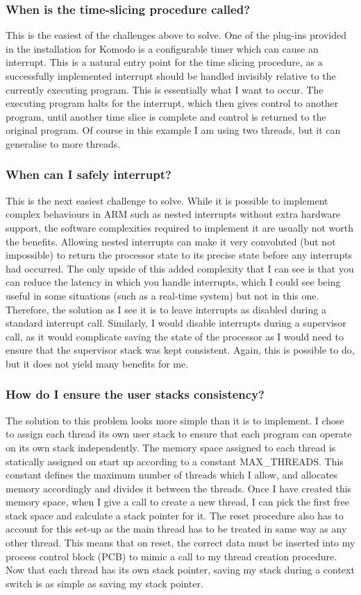 \subsubsection{When is the time-slicing procedure called?}
This is the easiest of the challenges above to solve. One of the plug-ins provided in the installation for Komodo is a configurable timer which can cause an interrupt. This is a natural entry point for the time slicing procedure, as a successfully implemented interrupt should be handled invisibly relative to the currently executing program. This is essentially what I want to occur. The executing program halts for the interrupt, which then gives control to another program, until another time slice is complete and control is returned to the original program. Of course in this example I am using two threads, but it can generalise to more threads. 
\subsubsection{When can I safely interrupt?}
This is the next easiest challenge to solve. While it is possible to implement complex behaviours in ARM such as nested interrupts without extra hardware support, the software complexities required to implement it are usually not worth the benefits. Allowing nested interrupts can make it very convoluted (but not impossible) to return the processor state to its precise state before any interrupts had occurred. The only upside of this added complexity that I can see is that you can reduce the latency in which you handle interrupts, which I could see being useful in some situations (such as a real-time system) but not in this one. Therefore, the solution as I see it is to leave interrupts as disabled during a standard interrupt call. Similarly, I would disable interrupts during a supervisor call, as it would complicate saving the state of the processor as I would need to ensure that the supervisor stack was kept consistent. Again, this is possible to do, but it does not yield many benefits for me.
\subsubsection{How do I ensure the user stacks consistency?}
The solution to this problem looks more simple than it is to implement. I chose to assign each thread its own user stack to ensure that each program can operate on its own stack independently. The memory space assigned to each thread is statically assigned on start up according to a constant MAX\_THREADS. This constant defines the maximum number of threads which I allow, and allocates memory accordingly and divides it between the threads.  Once I have created this memory space, when I give a call to create a new thread, I can pick the first free stack space and calculate a stack pointer for it. The reset procedure also has to account for this set-up as the main thread has to be treated in same way as any other thread.  This means that on reset, the correct data must be inserted into my process control block (PCB) to mimic a call to my thread creation procedure. Now that each thread has its own stack pointer, saving my stack during a context switch is as simple as saving my stack pointer.
\newpage
